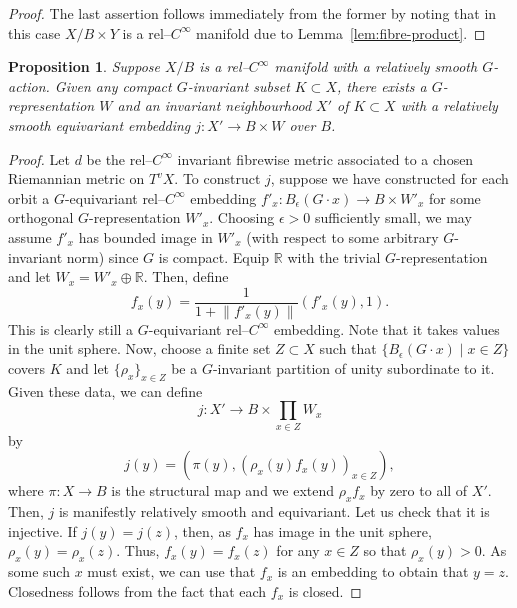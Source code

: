 \documentclass[11pt,psamsfonts, oneside, reqno]{amsart}
\newcommand{\sub}{\subset}%
\newcommand{\p}[2]{\prod\limits_{#1}{#2} }
\newcommand{\norm}[1]{\lVert#1\rVert}
\newcommand{\cl}{\colon}
\newcommand{\bR}{\mathbb{R}}
\newtheorem{proposition}[theorem]{Proposition}
\theoremstyle{definition}
\theoremstyle{remark}
\numberwithin{equation}{section}
\begin{document}
\begin{proof}
The last assertion follows immediately from the former by noting that in this case $X/B\times Y$ is a rel--$C^\infty$ manifold due to Lemma~\ref{lem:fibre-product}.
\end{proof}



\begin{proposition}\label{prop:embedding-in-representation} Suppose $X/B$ is a rel--$C^\infty$ manifold with a relatively smooth $G$-action. Given any compact $G$-invariant subset $K \sub X$, there exists a $G$-representation $W$ and an invariant neighbourhood $X'$ of $K \subset X$ with a relatively smooth equivariant embedding $j \cl X'\to B\times W$ over $B$.
\end{proposition}

\begin{proof}
	  Let $d$ be the rel--$C^\infty$ invariant fibrewise metric associated to a chosen Riemannian metric on $T^vX$. To construct $j$, suppose we have constructed for each orbit a $G$-equivariant rel--$C^\infty$ embedding $f'_x \cl  B_\epsilon(G\cdot x)\to B\times W'_x$ for some orthogonal $G$-representation $W'_x$. Choosing $\epsilon  > 0$ sufficiently small, we may assume $f'_x$ has bounded image in $W'_x$ (with respect to some arbitrary $G$-invariant norm) since $G$ is compact. Equip $\bR$ with the trivial $G$-representation and let $W_x = W'_x \oplus \bR$. Then, define 
	\begin{equation}\label{} 
		f_x(y) = \frac{1}{1+\norm{f'_x(y)}}(f'_x(y),1).
	\end{equation} 
	This is clearly still a $G$-equivariant rel--$C^\infty$ embedding. Note that it takes values in the unit sphere. Now, choose a finite set $Z\sub X$ such that $\{B_\epsilon(G\cdot x)\mid x \in Z\}$ covers $K$ and let $\{\rho_x\}_{x\in Z}$ be a $G$-invariant partition of unity subordinate to it. Given these data, we can define 
	\begin{equation}\label{} 
		j \cl X' \to B\times\p{x\in Z}{W_x}
	\end{equation}
	by 
	\begin{equation}\label{}
		j(y) = (\pi(y),(\rho_x(y)f_x(y))_{x\in Z}),
	\end{equation}
	where $\pi \cl X\to B$ is the structural map and we extend $\rho_x f_x$ by zero to all of $X'$. Then, $j$ is manifestly relatively smooth and equivariant. Let us check that it is injective. If $j(y) = j(z)$, then, as $f_x$ has image in the unit sphere, $\rho_x(y) = \rho_x(z)$. Thus, $f_x(y) = f_x(z)$ for any $x \in Z$ so that $\rho_x(y) > 0$. As some such $x$ must exist, we can use that $f_x$ is an embedding to obtain that $y = z$. Closedness follows from the fact that each $f_x$ is closed.\par 

\end{proof}
\end{document}
